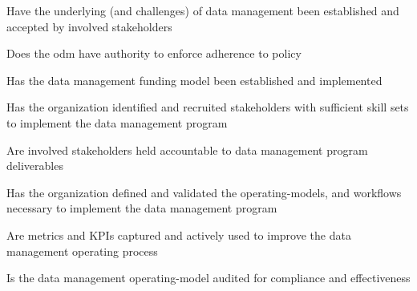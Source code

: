 %
%



\begin{maturity-dimensions}

  \item Have the underlying  (and challenges) of data management been established and
        accepted by involved stakeholders
  \item Does the \gls{odm} have authority to enforce adherence to policy
  \item Has the data management funding model been established and implemented
  \item Has the organization identified and recruited stakeholders with sufficient skill sets to
        implement the data management program
  \item Are involved stakeholders held accountable to data management program deliverables
  \item Has the organization defined and validated the \glspl{operating-model},
        and workflows necessary to implement the data management program
  \item Are metrics and KPIs captured and actively used to improve the data management operating process
  \item Is the data management \gls{operating-model} audited for compliance and effectiveness

\end{maturity-dimensions}


